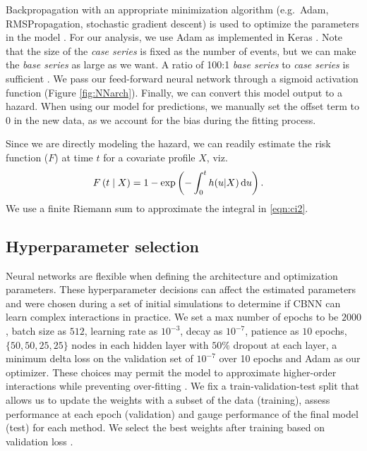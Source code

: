 \documentclass[AMA,STIX1COL,]{WileyNJD-v2}
\begin{document}
Backpropagation with an appropriate minimization algorithm (e.g.~Adam,
RMSPropagation, stochastic gradient descent) is used to optimize the
parameters in the model \citep{gulli2017}. For our analysis, we use Adam
as implemented in Keras \citep{gulli2017}. Note that the size of the
\emph{case series} is fixed as the number of events, but we can make the
\emph{base series} as large as we want. A ratio of 100:1 \emph{base
series} to \emph{case series} is sufficient \citep{hanley2009}. We pass
our feed-forward neural network through a sigmoid activation function
(Figure \ref{fig:NNarch}). Finally, we can convert this model output to
a hazard. When using our model for predictions, we manually set the
offset term to 0 in the new data, as we account for the bias during the
fitting process.

Since we are directly modeling the hazard, we can readily estimate the
risk function (\(F\)) at time \(t\) for a covariate profile \(X\),
viz.\begin{align}\label{eqn:ci2}
F\left(t\mid X\right)& = 1 - \exp\left(-\int_{0}^{t}h(u|X) \,\textrm du\right).
\end{align} We use a finite Riemann sum \citep{hughes2020calculus} to
approximate the integral in \eqref{eqn:ci2}.

\hypertarget{hyperparameter-selection}{%
\subsection{Hyperparameter selection}\label{hyperparameter-selection}}

Neural networks are flexible when defining the architecture and
optimization parameters. These hyperparameter decisions can affect the
estimated parameters and were chosen during a set of initial simulations
to determine if CBNN can learn complex interactions in practice. We set
a max number of epochs to be \(2000\), batch size as \(512\), learning
rate as \(10^{-3}\), decay as \(10^{-7}\), patience as \(10\) epochs,
\(\{50,50,25,25\}\) nodes in each hidden layer with \(50\%\) dropout at
each layer, a minimum delta loss on the validation set of \(10^{-7}\)
over 10 epochs and Adam \citep{gulli2017} as our optimizer. These
choices may permit the model to approximate higher-order interactions
while preventing over-fitting \citep{srivastava2014dropout}. We fix a
train-validation-test split that allows us to update the weights with a
subset of the data (training), assess performance at each epoch
(validation) and gauge performance of the final model (test) for each
method. We select the best weights after training based on validation
loss \citep{gulli2017}.
\end{document}
